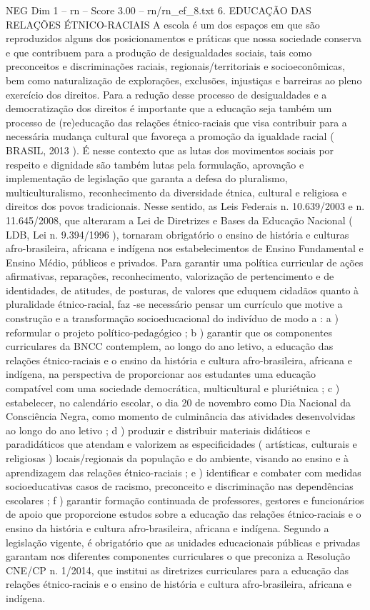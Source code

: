 \begin{textsample}{NEG Dim 1 – rn – Score 3.00 – rn/rn\_ef\_8.txt}  \label{ex:f1_neg_026}
6.
EDUCAÇÃO DAS RELAÇÕES ÉTNICO-RACIAIS A escola é um dos espaços em que são reproduzidos alguns dos posicionamentos e práticas que nossa sociedade conserva e que contribuem para a produção de desigualdades sociais, tais como preconceitos e discriminações raciais, regionais/territoriais e socioeconômicas, bem como naturalização de explorações, exclusões, injustiças e barreiras ao pleno exercício dos direitos.
Para a redução desse processo de desigualdades e a democratização dos direitos é importante que a educação seja também um processo de (re)educação das relações étnico-raciais que visa contribuir para a necessária mudança cultural que favoreça a promoção da igualdade racial ( BRASIL, 2013 ).
É nesse contexto que as lutas dos movimentos sociais por respeito e dignidade são também lutas pela formulação, aprovação e implementação de legislação que garanta a defesa do pluralismo, multiculturalismo, reconhecimento da diversidade étnica, cultural e religiosa e direitos dos povos tradicionais.
Nesse sentido, as Leis Federais n. 10.639/2003 e n. 11.645/2008, que alteraram a Lei de Diretrizes e Bases da Educação Nacional ( LDB, Lei n. 9.394/1996 ), tornaram obrigatório o ensino de história e culturas afro-brasileira, africana e indígena nos estabelecimentos de Ensino Fundamental e Ensino Médio, públicos e privados.
Para garantir uma política curricular de ações afirmativas, reparações, reconhecimento, valorização de pertencimento e de identidades, de atitudes, de posturas, de valores que eduquem cidadãos quanto à pluralidade étnico-racial, faz -se necessário pensar um currículo que motive a construção e a transformação socioeducacional do indivíduo de modo a : a ) reformular o projeto político-pedagógico ; b ) garantir que os componentes curriculares da BNCC contemplem, ao longo do ano letivo, a educação das relações étnico-raciais e o ensino da história e cultura afro-brasileira, africana e indígena, na perspectiva de proporcionar aos estudantes uma educação compatível com uma sociedade democrática, multicultural e pluriétnica ; c ) estabelecer, no calendário escolar, o dia 20 de novembro como Dia Nacional da Consciência Negra, como momento de culminância das atividades desenvolvidas ao longo do ano letivo ; d ) produzir e distribuir materiais didáticos e paradidáticos que atendam e valorizem as especificidades ( artísticas, culturais e religiosas ) locais/regionais da população e do ambiente, visando ao ensino e à aprendizagem das relações étnico-raciais ; e ) identificar e combater com medidas socioeducativas casos de racismo, preconceito e discriminação nas dependências escolares ; f ) garantir formação continuada de professores, gestores e funcionários de apoio que proporcione estudos sobre a educação das relações étnico-raciais e o ensino da história e cultura afro-brasileira, africana e indígena.
Segundo a legislação vigente, é obrigatório que as unidades educacionais públicas e privadas garantam nos diferentes componentes curriculares o que preconiza a Resolução CNE/CP n. 1/2014, que institui as diretrizes curriculares para a educação das relações étnico-raciais e o ensino de história e cultura afro-brasileira, africana e indígena.

\end{textsample}
